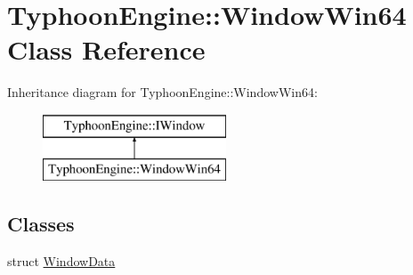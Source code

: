 \hypertarget{class_typhoon_engine_1_1_window_win64}{}\section{Typhoon\+Engine\+::Window\+Win64 Class Reference}
\label{class_typhoon_engine_1_1_window_win64}
Inheritance diagram for Typhoon\+Engine\+::Window\+Win64\+:\begin{figure}[H]
\begin{center}
\leavevmode
\includegraphics[height=2.000000cm]{class_typhoon_engine_1_1_window_win64}
\end{center}
\end{figure}
\subsection*{Classes}
\begin{DoxyCompactItemize}
\item 
struct \mbox{\hyperlink{struct_typhoon_engine_1_1_window_win64_1_1_window_data}{Window\+Data}}
\end{DoxyCompactItemize}
